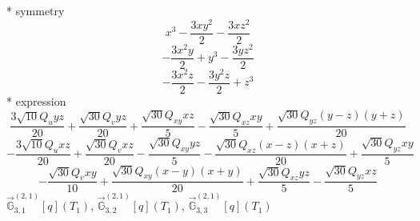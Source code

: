 \documentclass[fleqn,8pt]{jsarticle}
\begin{document}
\noindent\quad ** symmetry
\begin{dmath*}
x^{3} - \frac{3 x y^{2}}{2} - \frac{3 x z^{2}}{2}
\end{dmath*}
\begin{dmath*}
- \frac{3 x^{2} y}{2} + y^{3} - \frac{3 y z^{2}}{2}
\end{dmath*}
\begin{dmath*}
- \frac{3 x^{2} z}{2} - \frac{3 y^{2} z}{2} + z^{3}
\end{dmath*}
\noindent\quad ** expression
\begin{dmath*}
\frac{3 \sqrt{10} Q_{u} y z}{20} + \frac{\sqrt{30} Q_{v} y z}{20} + \frac{\sqrt{30} Q_{xy} x z}{5} - \frac{\sqrt{30} Q_{xz} x y}{5} + \frac{\sqrt{30} Q_{yz} \left(y - z\right) \left(y + z\right)}{20}
\end{dmath*}
\begin{dmath*}
- \frac{3 \sqrt{10} Q_{u} x z}{20} + \frac{\sqrt{30} Q_{v} x z}{20} - \frac{\sqrt{30} Q_{xy} y z}{5} - \frac{\sqrt{30} Q_{xz} \left(x - z\right) \left(x + z\right)}{20} + \frac{\sqrt{30} Q_{yz} x y}{5}
\end{dmath*}
\begin{dmath*}
- \frac{\sqrt{30} Q_{v} x y}{10} + \frac{\sqrt{30} Q_{xy} \left(x - y\right) \left(x + y\right)}{20} + \frac{\sqrt{30} Q_{xz} y z}{5} - \frac{\sqrt{30} Q_{yz} x z}{5}
\end{dmath*}
\noindent\quad $\vec{\mathbb{G}}_{3,1}^{(2,1)}[q](T_{1})$, $\vec{\mathbb{G}}_{3,2}^{(2,1)}[q](T_{1})$, $\vec{\mathbb{G}}_{3,3}^{(2,1)}[q](T_{1})$
\end{document}
